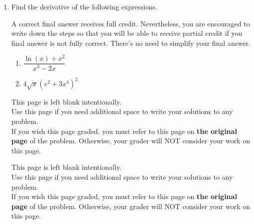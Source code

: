 \documentclass[11pt]{article}
\begin{document}
\begin{enumerate}
\begin{center}
\end{center}



\newpage


\item Find the derivative of the following expressions. 

A correct final answer receives full credit. Nevertheless, you are encouraged to write down the steps so that you will be able to receive partial credit if you final answer is not fully correct. There's no need to simplify your final answer.

\begin{enumerate}
\item $\dfrac{\ln(x)+x^2}{x^3-2x}$

\vfill

\item $4\sqrt{x}\left(e^2+3x^4\right)^2$

\vfill 
\end{enumerate}


%

\newpage

This page is left blank intentionally.\\

Use this page if you need additional space to write your solutions to any problem. \\

If you wish this page graded, you must refer to this page on \textbf{the original page} of the problem. Otherwise, your grader will NOT consider your work on this page.

\newpage

This page is left blank intentionally.\\

Use this page if you need additional space to write your solutions to any problem. \\

If you wish this page graded, you must refer to this page on \textbf{the original page} of the problem. Otherwise, your grader will NOT consider your work on this page.

\end{enumerate}
\end{document}

